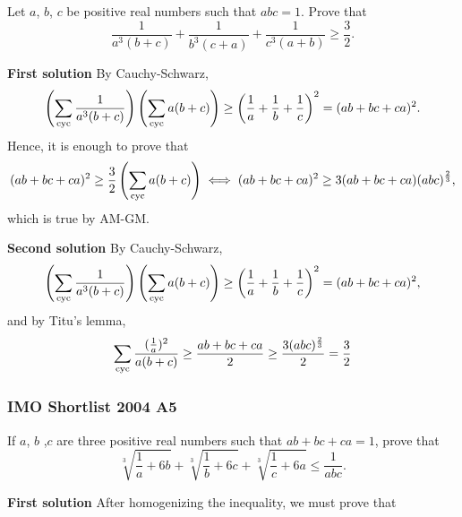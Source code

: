 \begin{problem}
Let $ a$, $ b$, $ c$ be positive real numbers such that $ abc = 1$. Prove that
\[
	\frac {1}{a^{3}\left(b + c\right)} + \frac {1}{b^{3}\left(c + a\right)} + \frac {1}{c^{3}\left(a + b\right)}\geq \frac {3}{2}.
\]
\end{problem}

\textcolor{color1}{\textbf{First solution}} By Cauchy-Schwarz,
\[
	\left(\sum_{\text{cyc}} \frac{1}{a^3(b+c)}\right)\left(\sum_{\text{cyc}} a(b+c)\right) \geq
	\left(\frac{1}{a} + \frac{1}{b} + \frac{1}{c}\right)^2 = (ab+bc+ca)^2.
\]
Hence, it is enough to prove that
\[
	(ab+bc+ca)^2 \geq \frac{3}{2}\left(\sum_{\text{cyc}} a(b+c)\right) \iff (ab+bc+ca)^2 \geq 3(ab+bc+ca)(abc)^{\frac{2}{3}},
\]
which is true by AM-GM.

\textcolor{color1}{\textbf{Second solution}} By Cauchy-Schwarz,
\[
	\left(\sum_{\text{cyc}} \frac{1}{a^3(b+c)}\right)\left(\sum_{\text{cyc}} a(b+c)\right) \geq
	\left(\frac{1}{a} + \frac{1}{b} + \frac{1}{c}\right)^2 = (ab+bc+ca)^2,
\]
and by Titu's lemma,
\[
	\sum_{\text{cyc}} \frac{(\frac{1}{a})^2}{a(b+c)} \geq \frac{ab+bc+ca}{2} \ge \frac{3(abc)^{\frac{2}{3}}}{2} = \frac{3}{2}
\]
\clearpage

\subsubsection{IMO Shortlist 2004 A5}
\begin{problem}
If $a$, $b$ ,$c$ are three positive real numbers such that $ab+bc+ca = 1$, prove that\[ \sqrt[3]{ \frac{1}{a} + 6b} + \sqrt[3]{\frac{1}{b} + 6c} + \sqrt[3]{\frac{1}{c} + 6a } \leq \frac{1}{abc}.  \]
\end{problem}

\textbf{\textcolor{color2}{First solution}} After homogenizing the inequality, we must prove that

